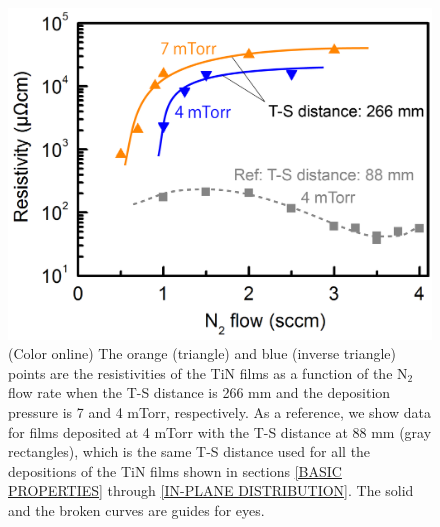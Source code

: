 \documentclass{report}
\begin{document}
\begin{figure}
\begin{center}
\includegraphics{TS-change.jpg}
\end{center}
\caption{(Color online) The orange (triangle) and blue (inverse triangle) points are the resistivities of the TiN films as a function of the N$_{2}$ flow rate when the T-S distance is 266 mm and the deposition pressure is 7 and 4 mTorr, respectively. As a reference, we show data for films deposited at 4 mTorr with the T-S distance at 88 mm (gray rectangles), which is the same T-S distance used for all the depositions of the TiN films shown in sections \ref{BASIC PROPERTIES} through \ref{IN-PLANE DISTRIBUTION}. The solid and the broken curves are guides for eyes.}
\label{TS-change}
\end{figure}
\end{document}
